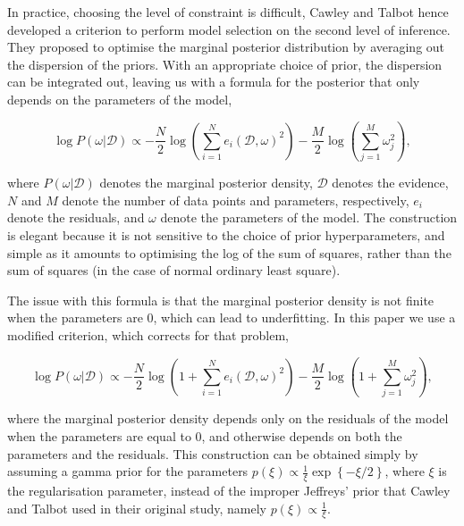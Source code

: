 \documentclass[11pt, oneside]{article}
\begin{document}
In practice, choosing the level of constraint is difficult, Cawley and Talbot hence developed a criterion to perform model selection on the second level of inference.
They proposed to optimise the marginal posterior distribution by averaging out the dispersion of the priors.
With an appropriate choice of prior, the dispersion can be integrated out, leaving us with a formula for the posterior that only depends on the parameters of the model,

\vspace{-0.5cm}
\begin{equation}
	\log P(\omega | \mathcal{D}) \propto - \frac{N}{2} \log \left(\sum_{i=1}^{N} e_i(\mathcal{D},\omega)^2\right) - \frac{M}{2} \log \left(\sum_{j=1}^{M} \omega_{j}^2 \right),
\end{equation}

where $P(\omega|\mathcal{D})$ denotes the marginal posterior density, $\mathcal{D}$ denotes the evidence, $N$ and $M$ denote the number of data points and parameters, respectively, $e_i$ denote the residuals, and $\omega$ denote the parameters of the model.
The construction is elegant because it is not sensitive to the choice of prior hyperparameters, and simple as it amounts to optimising the log of the sum of squares, rather than the sum of squares (in the case of normal ordinary least square).

The issue with this formula is that the marginal posterior density is not finite when the parameters are 0, which can lead to underfitting.
In this paper we use a modified criterion, which corrects for that problem,

\vspace{-0.5cm}
\begin{equation}
	\log P(\omega | \mathcal{D}) \propto - \frac{N}{2} \log \left(1 + \sum_{i=1}^{N} e_i(\mathcal{D},\omega)^2\right) - \frac{M}{2} \log \left(1 + \sum_{j=1}^{M} \omega_{j}^2 \right),
\end{equation}

where the marginal posterior density depends only on the residuals of the model when the parameters are equal to 0, and otherwise depends on both the parameters and the residuals. 
This construction can be obtained simply by assuming a gamma prior for the parameters $p(\xi) \propto \frac{1}{\xi} \exp\left\{- \xi/2 \right\}$, where $\xi$ is the regularisation parameter, instead of the improper Jeffreys' prior that Cawley and Talbot used in their original study, namely $p(\xi) \propto \frac{1}{\xi}$. 
\end{document}
